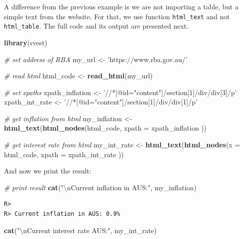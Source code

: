 \documentclass[
  12pt,
]{book}
\newenvironment{Shaded}{\begin{snugshade}}{\end{snugshade}}
\newcommand{\CharTok}[1]{\textcolor[rgb]{0.5,0.5,0.5}{#1}}
\newcommand{\CommentTok}[1]{\textcolor[rgb]{0.37,0.37,0.37}{\textit{#1}}}
\newcommand{\DataTypeTok}[1]{\textcolor[rgb]{0.27,0.27,0.27}{#1}}
\newcommand{\KeywordTok}[1]{\textcolor[rgb]{0.27,0.27,0.27}{\textbf{#1}}}
\newcommand{\NormalTok}[1]{#1}
\newcommand{\StringTok}[1]{\textcolor[rgb]{0.5,0.5,0.5}{#1}}
\begin{document}
A difference from the previous example is we are not importing a table, but a simple text from the website. For that, we use function \texttt{html\_text} and not \texttt{html\_table}. The full code and its output are presented next.

\begin{Shaded}
\begin{Highlighting}[]
\KeywordTok{library}\NormalTok{(rvest)}

\CommentTok{# set address of RBA}
\NormalTok{my_url <-}\StringTok{ 'https://www.rba.gov.au/'}

\CommentTok{# read html}
\NormalTok{html_code <-}\StringTok{ }\KeywordTok{read_html}\NormalTok{(my_url)}

\CommentTok{# set xpaths}
\NormalTok{xpath_inflation <-}\StringTok{ '//*[@id="content"]/section[1]/div/div[3]/p'}
\NormalTok{xpath_int_rate <-}\StringTok{ '//*[@id="content"]/section[1]/div/div[1]/p'}

\CommentTok{# get inflation from html}
\NormalTok{my_inflation <-}\StringTok{ }\KeywordTok{html_text}\NormalTok{(}\KeywordTok{html_nodes}\NormalTok{(html_code,}
                                     \DataTypeTok{xpath =}\NormalTok{ xpath_inflation ))}

\CommentTok{# get interest rate from html}
\NormalTok{my_int_rate <-}\StringTok{ }\KeywordTok{html_text}\NormalTok{(}\KeywordTok{html_nodes}\NormalTok{(}\DataTypeTok{x =}\NormalTok{ html_code,}
                                    \DataTypeTok{xpath =}\NormalTok{ xpath_int_rate ))}
\end{Highlighting}
\end{Shaded}

And now we print the result:

\begin{Shaded}
\begin{Highlighting}[]
\CommentTok{# print result}
\KeywordTok{cat}\NormalTok{(}\StringTok{"}\CharTok{\textbackslash{}n}\StringTok{Current inflation in AUS:"}\NormalTok{, my_inflation)}
\end{Highlighting}
\end{Shaded}

\begin{verbatim}
R> 
R> Current inflation in AUS: 0.9%
\end{verbatim}

\begin{Shaded}
\begin{Highlighting}[]
\KeywordTok{cat}\NormalTok{(}\StringTok{"}\CharTok{\textbackslash{}n}\StringTok{Current interest rate AUS:"}\NormalTok{, my_int_rate)}
\end{Highlighting}
\end{Shaded}
\end{document}
